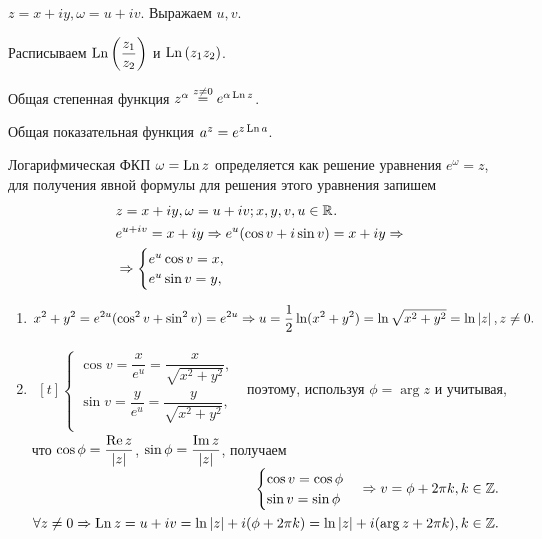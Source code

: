 \begin{plan}
\item $z = x + iy, \omega = u + iv$. Выражаем $u, v$.
\item Расписываем $\operatorname{Ln}\left( \dfrac{z_1}{z_2} \right)$ и $\operatorname{Ln}\left( z_1z_2 \right)$.
\item Общая степенная функция $z^{\alpha} \overset{z \neq 0}{=} e^{\alpha \operatorname{Ln} z}$.
\item Общая показательная функция $a^z = e^{z\operatorname{Ln} a}$.
\end{plan}

\begin{col-answer-preambule}
\end{col-answer-preambule}
Логарифмическая ФКП $\omega = \operatorname{Ln} z$ определяется как решение уравнения $e^{\omega} = z$, для
получения явной формулы для решения этого уравнения запишем
\begin{align*}
  &z = x + iy, \omega = u + iv; x, y, v, u \in \mathbb{R}^{}.\\
  &e^{u + iv} = x + iy \Rightarrow e^u(\cos v + i\sin v) = x + iy \Rightarrow\\
  &\Rightarrow
  \begin{cases}
    e^u\cos v = x,\\
    e^u\sin v = y,
  \end{cases}
\end{align*}
\begin{enumerate}
\item $\begin{aligned}[t]
  x^2 + y^2 = e^{2u}(\cos^2v + \sin^2v) = e^{2u} \Rightarrow u = \dfrac{1}{2}\ln(x^2 + y^2) =
  \ln\sqrt{x^2 + y^2} = \ln\left\lvert z \right\rvert, z \neq 0.
\end{aligned}$
\item $\begin{aligned}[t]
\begin{cases}
  \cos v = \dfrac{x}{e^u} = \dfrac{x}{\sqrt{x^2 + y^2}},\\
  \sin v = \dfrac{y}{e^u} = \dfrac{y}{\sqrt{x^2 + y^2}},\\
\end{cases}
\end{aligned}$
  поэтому, используя $\phi = \arg z$ и учитывая, что $\cos \phi =
  \dfrac{\operatorname{Re} z}{\left\lvert z \right\rvert}$, ${\sin \phi = \dfrac{\operatorname{Im}z}{\left\lvert z \right\rvert}}$,
  получаем
  $\begin{aligned}[t]
    \begin{cases}
      \cos v = \cos \phi\\
      \sin v = \sin \phi\\
    \end{cases}
    \Rightarrow v = \phi + 2\pi k, k \in \mathbb{Z}.\\
    \forall z \neq 0 \Rightarrow \operatorname{Ln} z = u + iv = \ln\left\lvert z \right\rvert + i(\phi + 2\pi k) =
    \ln\left\lvert z \right\rvert + i(\arg z + 2\pi k), k \in \mathbb{Z}.
  \end{aligned}$
\end{enumerate}
